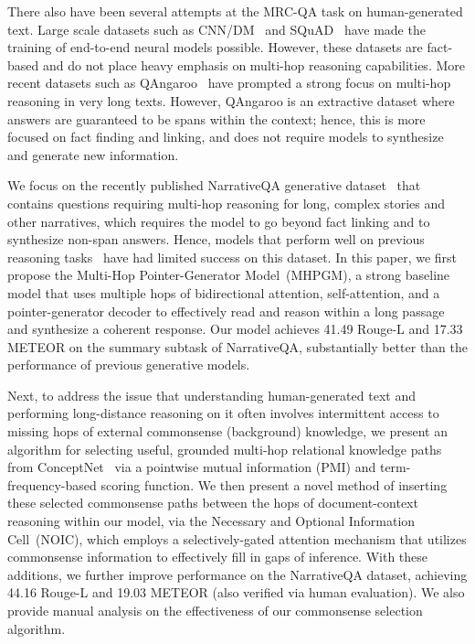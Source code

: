 \documentclass[11pt,a4paper]{article}
\newcommand{\baseline}{Multi-Hop Pointer-Generator Model}
\newcommand{\baselineAbbv}{MHPGM}
\newcommand{\fullModel}{NOIC}
\newcommand{\fullModelFullName}{Necessary and Optional Information Cell~}
\begin{document}
There also have been several attempts at the MRC-QA task on human-generated text. Large scale datasets such as CNN/DM~\cite{cnndm} and SQuAD~\cite{rajpurkar2016squad} have made the training of end-to-end neural models possible.
However, these datasets are fact-based and do not place heavy emphasis on multi-hop reasoning capabilities.
More recent datasets such as QAngaroo~\cite{welbl2017constructing} have prompted a strong focus on multi-hop reasoning in very long texts.
However, QAngaroo is an extractive dataset where answers are guaranteed to be spans within the context; hence, this is more focused on fact finding and linking, and does not require models to synthesize and generate new information.



We focus on the recently published NarrativeQA generative dataset~\cite{kovcisky2017narrativeqa} that contains questions requiring multi-hop reasoning for long, complex stories and other narratives, which requires the model to go beyond fact linking and to synthesize non-span answers.
Hence, models that perform well on previous reasoning tasks~\cite{dhingra2018neural} have had limited success on this dataset.
In this paper, we first propose the \baseline\ (\baselineAbbv), a strong baseline model that uses multiple hops of bidirectional attention, self-attention, and a pointer-generator decoder to effectively read and reason within a long passage and synthesize a coherent response.
Our model achieves 41.49 Rouge-L and 17.33 METEOR on the summary subtask of NarrativeQA, substantially better than the performance of previous generative models.


Next, to address the issue that understanding human-generated text and performing long-distance reasoning on it often involves intermittent access to missing hops of external commonsense (background) knowledge, we present an algorithm for selecting useful, grounded multi-hop relational knowledge paths from ConceptNet~\cite{speer2012representing} via a pointwise mutual information (PMI) and term-frequency-based scoring function.
We then present a novel method of inserting these selected commonsense paths between the hops of document-context reasoning within our model, via the \fullModelFullName (\fullModel), which employs a selectively-gated attention mechanism that utilizes commonsense information to effectively fill in gaps of inference.
With these additions, we further improve performance on the NarrativeQA dataset, achieving 44.16 Rouge-L and 19.03 METEOR (also verified via human evaluation). We also provide manual analysis on the effectiveness of our commonsense selection algorithm.
\end{document}
